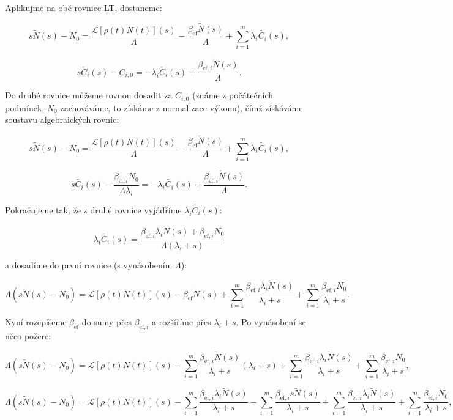 Aplikujme na obě rovnice LT, dostaneme:

$$ s \tilde{N}(s) - N_0 = \dfrac{\mathcal{L}[\rho(t) N(t)](s)}{\Lambda} - \dfrac{\beta_{\text{ef}} \tilde{N}(s)}{\Lambda} + \sum_{i=1}^m \lambda_i \tilde{C_i}(s), $$

$$ s \tilde{C_i}(s) - C_{i,0} = -\lambda_i \tilde{C_i}(s) + \dfrac{\beta_{\text{ef},i}  \tilde{N}(s)}{\Lambda}. $$

Do druhé rovnice můžeme rovnou dosadit za $C_{i,0}$ (známe z počátečních podmínek, $N_0$ zachováváme, to získáme z normalizace výkonu), čímž získáváme soustavu algebraických rovnic:

$$ s \tilde{N}(s) - N_0 = \dfrac{\mathcal{L}[\rho(t) N(t)](s)}{\Lambda} - \dfrac{\beta_{\text{ef}} \tilde{N}(s)}{\Lambda} + \sum_{i=1}^m \lambda_i \tilde{C_i}(s), $$

$$ s \tilde{C_i}(s) - \dfrac{\beta_{\text{ef},i}  N_0}{\Lambda \lambda_i} = -\lambda_i \tilde{C_i}(s) + \dfrac{\beta_{\text{ef},i}  \tilde{N}(s)}{\Lambda}. $$

Pokračujeme tak, že z druhé rovnice vyjádříme $\lambda_i \tilde{C_i}(s)$:

$$ \lambda_i \tilde{C_i}(s) = \dfrac{\beta_{\text{ef},i} \lambda_i \tilde{N}(s) + \beta_{\text{ef},i}N_0}{\Lambda(\lambda_i + s)} $$

a dosadíme do první rovnice (s vynásobením $\Lambda$):

$$ \Lambda (s \tilde{N}(s) - N_0) = \mathcal{L}[\rho(t) N(t)](s) - \beta_{\text{ef}} \tilde{N}(s) + \sum_{i=1}^m \dfrac{\beta_{\text{ef},i} \lambda_i \tilde{N}(s)}{\lambda_i + s} + \sum_{i=1}^m \dfrac{\beta_{\text{ef},i}N_0}{\lambda_i + s}. $$

Nyní rozepíšeme $\beta_{\text{ef}}$ do sumy přes $\beta_{\text{ef},i}$ a rozšíříme přes $\lambda_i + s$. Po vynásobení se něco požere:

$$ \Lambda (s \tilde{N}(s) - N_0) = \mathcal{L}[\rho(t) N(t)](s) - \sum_{i=1}^m \dfrac{\beta_{\text{ef},i} \tilde{N}(s)}{\lambda_i + s}(\lambda_i + s) + \sum_{i=1}^m \dfrac{\beta_{\text{ef},i} \lambda_i \tilde{N}(s)}{\lambda_i + s} + \sum_{i=1}^m \dfrac{\beta_{\text{ef},i}N_0}{\lambda_i + s}, $$

$$ \Lambda (s \tilde{N}(s) - N_0) = \mathcal{L}[\rho(t) N(t)](s) - \sum_{i=1}^m \dfrac{\beta_{\text{ef},i} \lambda_i \tilde{N}(s)}{\lambda_i + s} - \sum_{i=1}^m \dfrac{\beta_{\text{ef},i} s \tilde{N}(s)}{\lambda_i + s} + \sum_{i=1}^m \dfrac{\beta_{\text{ef},i} \lambda_i \tilde{N}(s)}{\lambda_i + s} + \sum_{i=1}^m \dfrac{\beta_{\text{ef},i}N_0}{\lambda_i + s}, $$

